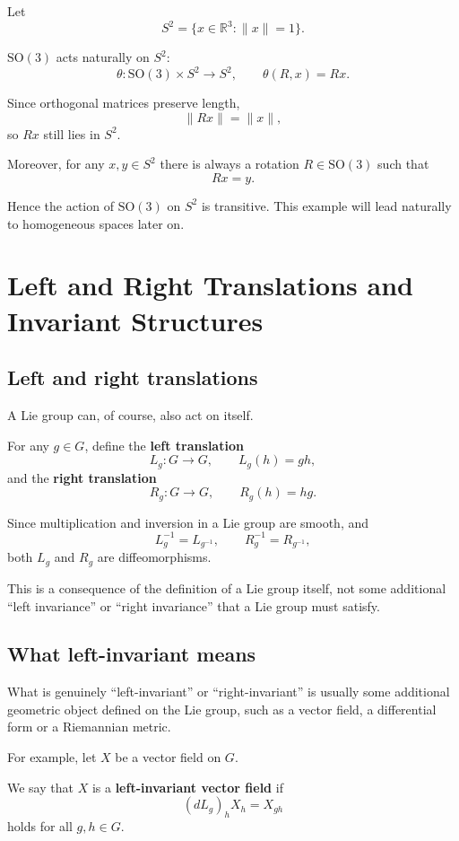 \documentclass[11pt]{article}
\begin{document}
Let
\[
S^2
=
\{x\in\mathbb{R}^3:\|x\|=1\}.
\]

$\mathrm{SO}(3)$ acts naturally on $S^2$:
\[
\theta:\mathrm{SO}(3)\times S^2\to S^2,
\qquad
\theta(R,x)=Rx.
\]

Since orthogonal matrices preserve length,
\[
\|Rx\|=\|x\|,
\]
so $Rx$ still lies in $S^2$.

Moreover, for any $x,y\in S^2$ there is always a rotation $R\in\mathrm{SO}(3)$ such that
\[
Rx=y.
\]

Hence the action of $\mathrm{SO}(3)$ on $S^2$ is transitive. This example will lead naturally to homogeneous spaces later on.


\section{Left and Right Translations and Invariant Structures}

\subsection{Left and right translations}

A Lie group can, of course, also act on itself.

For any $g\in G$, define the \textbf{left translation}
\[
L_g:G\to G,
\qquad
L_g(h)=gh,
\]
and the \textbf{right translation}
\[
R_g:G\to G,
\qquad
R_g(h)=hg.
\]

Since multiplication and inversion in a Lie group are smooth, and
\[
L_g^{-1}=L_{g^{-1}},
\qquad
R_g^{-1}=R_{g^{-1}},
\]
both $L_g$ and $R_g$ are diffeomorphisms.

This is a consequence of the definition of a Lie group itself, not some additional ``left invariance'' or ``right invariance'' that a Lie group must satisfy.


\subsection{What left-invariant means}

What is genuinely ``left-invariant'' or ``right-invariant'' is usually some additional geometric object defined on the Lie group, such as a vector field, a differential form or a Riemannian metric.

For example, let $X$ be a vector field on $G$.

We say that $X$ is a \textbf{left-invariant vector field} if
\[
(dL_g)_hX_h
=
X_{gh}
\]
holds for all $g,h\in G$.
\end{document}
